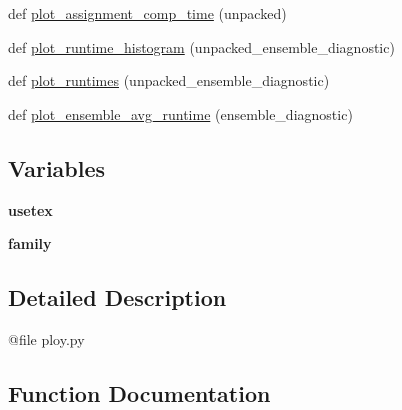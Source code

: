 \begin{DoxyCompactItemize}
\item 
def \mbox{\hyperlink{namespace_d_o_t__assignment_1_1plot_a41c48deaad4aadf9bac59a450318d1e5}{plot\+\_\+assignment\+\_\+comp\+\_\+time}} (unpacked)
\item 
def \mbox{\hyperlink{namespace_d_o_t__assignment_1_1plot_afbb74722a284cbde02592718454e2527}{plot\+\_\+runtime\+\_\+histogram}} (unpacked\+\_\+ensemble\+\_\+diagnostic)
\item 
def \mbox{\hyperlink{namespace_d_o_t__assignment_1_1plot_a50114c367603224c13ffcbe4a3b9af57}{plot\+\_\+runtimes}} (unpacked\+\_\+ensemble\+\_\+diagnostic)
\item 
def \mbox{\hyperlink{namespace_d_o_t__assignment_1_1plot_a445286ce718da0ac59c11bcc6de51311}{plot\+\_\+ensemble\+\_\+avg\+\_\+runtime}} (ensemble\+\_\+diagnostic)
\end{DoxyCompactItemize}
\subsection*{Variables}
\begin{DoxyCompactItemize}
\item 
\mbox{\label{namespace_d_o_t__assignment_1_1plot_ad39f6966f93d9a3edef8933619dc0593}} 
{\bfseries usetex}
\item 
\mbox{\label{namespace_d_o_t__assignment_1_1plot_a83d68292992857a1d5bbec915ff64a03}} 
{\bfseries family}
\end{DoxyCompactItemize}


\subsection{Detailed Description}
\begin{DoxyVerb}@file ploy.py
\end{DoxyVerb}
 

\subsection{Function Documentation}
\mbox{\label{namespace_d_o_t__assignment_1_1plot_a00241245b524e0e63ba66555364afcf5}} 
